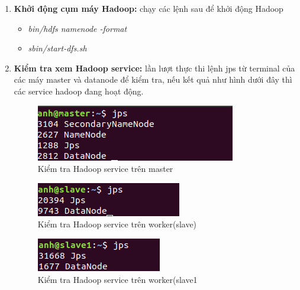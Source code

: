 \begin{enumerate}
			\item \textbf{Khởi động cụm máy Hadoop: }chạy các lệnh sau để khởi động Hadoop
			\begin{itemize}
				\item \textit{bin/hdfs namenode -format}
				\item \textit{sbin/start-dfs.sh}			
			\end{itemize}
			\item \textbf{Kiểm tra xem Hadoop service:} lần lượt thực thi lệnh jps từ terminal của các máy master và datanode để kiểm tra, nếu kết quả như hình dưới đây thì các service hadoop đang hoạt động.
			\begin{figure}[h!]
				\centering
				\includegraphics[scale=0.8]{charts/jps-m.png}
				\caption{Kiểm tra Hadoop service trên master}
				\label{fig:jps-m}
			\end{figure}
			\begin{figure}[h!]
				\centering
				\includegraphics[scale=0.8]{charts/jps-s.png}
				\caption{Kiểm tra Hadoop service trên worker(slave)}
				\label{fig:jps-s}
			\end{figure}
			\begin{figure}[h!]
				\centering
				\includegraphics[scale=0.8]{charts/jps-s1.png}
				\caption{Kiểm tra Hadoop service trên worker(slave1}
				\label{fig:jps-s1}
			\end{figure}
			
			
		\end{enumerate}
		
